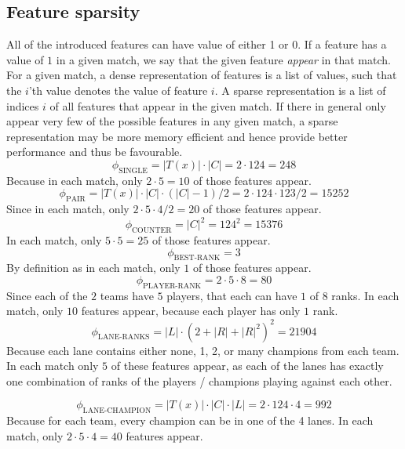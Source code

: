 \subsection{Feature sparsity}\label{sec:featuresparsity}
All of the introduced features can have value of either 1 or 0. If a feature has a value of $1$ in a given match, we say that the given feature \textit{appear} in that match.
For a given match, a dense representation of features is a list of values, such that the $i$'th value denotes the value of feature $i$.
A sparse representation is a list of indices $i$ of all features that appear in the given match.
If there in general only appear very few of the possible features in any given match, a sparse representation may be more memory efficient and hence provide better performance  and thus be favourable.
\[\phi_{\text{SINGLE}} = |T(x)| \cdot |C| = 2 \cdot 124 = 248\] 
Because in each match, only $2 \cdot 5 = 10$ of those features appear.
\[\phi_{\text{PAIR}} = |T(x)| \cdot |C| \cdot (|C|-1) / 2 = 2 \cdot 124 \cdot 123 / 2 = 15252\] 
Since in each match, only $2 \cdot 5 \cdot 4 / 2 = 20$ of those features appear.
\[\phi_{\text{COUNTER}} = |C|^2 = 124^2 = 15376\] 
In each match, only $5 \cdot 5 = 25$ of those features appear.
\[\phi_{\text{BEST-RANK}} = 3\] 
By definition as in each match, only $1$ of those features appear.
\[\phi_{\text{PLAYER-RANK}} = 2 \cdot 5 \cdot 8 = 80\] 
Since each of the $2$ teams have $5$ players, that each can have $1$ of $8$ ranks. In each match, only $10$ features appear, because each player has only $1$ rank.
\[\phi_{\text{LANE-RANKS}} = |L| \cdot (2 + |R| + |R|^2)^2 = 21904\]
Because each lane contains either none, 1, 2, or many champions from each team.
In each match only $5$ of these features appear, as each of the lanes has exactly one combination of ranks of the players / champions playing against each other.

\[\phi_{\text{LANE-CHAMPION}} = |T(x)| \cdot |C| \cdot |L| = 2 \cdot 124 \cdot 4 = 992\]
Because for each team, every champion can be in one of the 4 lanes. In each match, only $2 \cdot 5 \cdot 4 = 40$ features appear.


